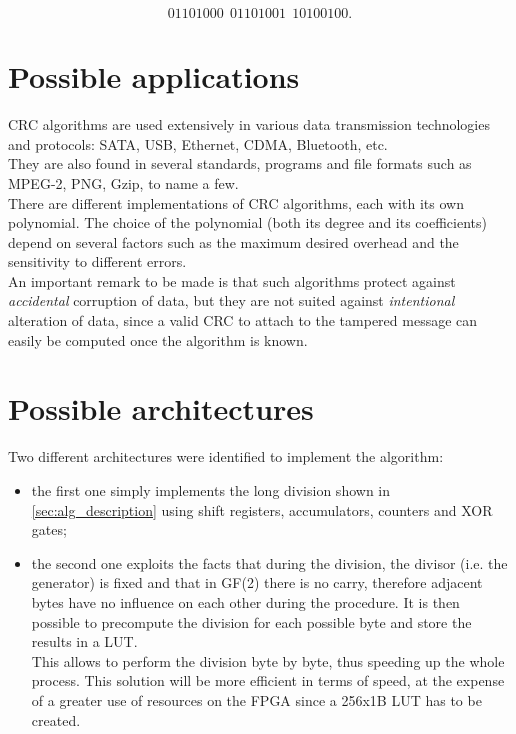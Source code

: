 	\begin{equation}
	01101000\:\:01101001\:\:10100100 .
	\label{eq:example_with_FCS}	
	\end{equation}


\section{Possible applications}\label{sec:applications}
CRC algorithms are used extensively in various data transmission technologies and protocols: SATA, USB, Ethernet, CDMA, Bluetooth, etc.\\
They are also found in several standards, programs and file formats such as MPEG-2, PNG, Gzip, to name a few.\\
There are different implementations of CRC algorithms, each with its own polynomial. The choice of the polynomial (both its degree and its coefficients) depend on several factors such as the maximum desired overhead and the sensitivity to different errors.\\

\noindent An important remark to be made is that such algorithms protect against \textit{accidental} corruption of data, but they are not suited against \textit{intentional} alteration of data, since a valid CRC to attach to the tampered message can easily be computed once the algorithm is known.

\section{Possible architectures}\label{sec:architectures}
Two different architectures were identified to implement the algorithm:
\begin{itemize}
\item the first one simply implements the long division shown in \ref{sec:alg_description} using shift registers, accumulators, counters and XOR gates;\\
\item the second one exploits the facts that during the division, the divisor (i.e. the generator) is fixed and that in GF(2) there is no carry, therefore adjacent bytes have no influence on each other during the procedure. It is then possible to precompute the division for each possible byte and store the results in a LUT.\\
This allows to perform the division byte by byte, thus speeding up the whole process. This solution will be more efficient in terms of speed, at the expense of a greater use of resources on the FPGA since a 256x1B LUT has to be created.
\end{itemize}